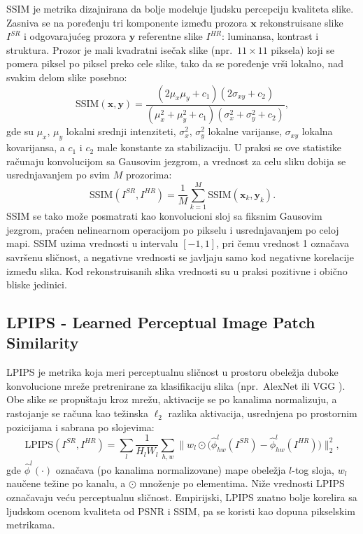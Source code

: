 \documentclass[12pt,a4paper]{article}
\begin{document}
SSIM \cite{SSIM2004} je metrika dizajnirana da bolje modeluje ljudsku percepciju kvaliteta slike. Zasniva se na poređenju tri komponente između prozora $\mathbf{x}$ rekonstruisane slike $I^{SR}$ i odgovarajućeg prozora $\mathbf{y}$ referentne slike $I^{HR}$: luminansa, kontrast i struktura. Prozor je mali kvadratni isečak slike (npr.\ $11\times11$ piksela) koji se pomera piksel po piksel preko cele slike, tako da se poređenje vrši lokalno, nad svakim delom slike posebno:
\begin{equation}
    \text{SSIM}(\mathbf{x}, \mathbf{y}) = \frac{(2\mu_x \mu_y + c_1)(2\sigma_{xy} + c_2)}{(\mu_x^2 + \mu_y^2 + c_1)(\sigma_x^2 + \sigma_y^2 + c_2)},
\end{equation}
gde su $\mu_x$, $\mu_y$ lokalni srednji intenziteti, $\sigma_x^2$, $\sigma_y^2$ lokalne varijanse, $\sigma_{xy}$ lokalna kovarijansa, a $c_1$ i $c_2$ male konstante za stabilizaciju. U praksi se ove statistike računaju konvolucijom sa Gausovim jezgrom, a vrednost za celu sliku dobija se usrednjavanjem po svim $M$ prozorima:
\begin{equation}
    \text{SSIM}(I^{SR}, I^{HR}) = \frac{1}{M} \sum_{k=1}^{M} \text{SSIM}(\mathbf{x}_k, \mathbf{y}_k).
\end{equation}
SSIM se tako može posmatrati kao konvolucioni sloj sa fiksnim Gausovim jezgrom, praćen nelinearnom operacijom po pikselu i usrednjavanjem po celoj mapi. SSIM uzima vrednosti u intervalu $[-1, 1]$, pri čemu vrednost 1 označava savršenu sličnost, a negativne vrednosti se javljaju samo kod negativne korelacije između slika. Kod rekonstruisanih slika vrednosti su u praksi pozitivne i obično bliske jedinici.

\subsection{LPIPS - Learned Perceptual Image Patch Similarity}
\label{sec:lpips}

LPIPS \cite{LPIPS} je metrika koja meri perceptualnu sličnost u prostoru obeležja duboke konvolucione mreže pretrenirane za klasifikaciju slika (npr.\ AlexNet \cite{AlexNet} ili VGG \cite{VGG}). Obe slike se propuštaju kroz mrežu, aktivacije se po kanalima normalizuju, a rastojanje se računa kao težinska $\ell_2$ razlika aktivacija, usrednjena po prostornim pozicijama i sabrana po slojevima:
\begin{equation}
    \text{LPIPS}(I^{SR}, I^{HR}) = \sum_{l} \frac{1}{H_l W_l} \sum_{h,w}
    \big\| w_l \odot \big( \hat{\phi}^l_{hw}(I^{SR}) - \hat{\phi}^l_{hw}(I^{HR}) \big) \big\|_2^2,
\end{equation}
gde $\hat{\phi}^l(\cdot)$ označava (po kanalima normalizovane) mape obeležja $l$-tog sloja, $w_l$ naučene težine po kanalu, a $\odot$ množenje po elementima. Niže vrednosti LPIPS označavaju veću perceptualnu sličnost. Empirijski, LPIPS znatno bolje korelira sa ljudskom ocenom kvaliteta od PSNR i SSIM, pa se koristi kao dopuna pikselskim metrikama.
\end{document}
